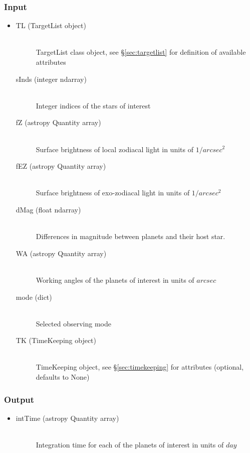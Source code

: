 \documentclass[cleanfoot]{asme2ej}
\begin{document}
\subsubsection*{Input}
\begin{itemize}
\item 
\begin{description}
    \item[TL (TargetList object)] \hfill \\ TargetList class object, see \S\ref{sec:targetlist} for definition of available attributes
    \item[sInds (integer ndarray)] \hfill \\ Integer indices of the stars of interest
    \item[fZ (astropy Quantity array)] \hfill \\ Surface brightness of local zodiacal light in units of $ 1/arcsec^2 $
    \item[fEZ (astropy Quantity array)] \hfill \\ Surface brightness of exo-zodiacal light in units of $ 1/arcsec^2 $
    \item[dMag (float ndarray)] \hfill \\ Differences in magnitude between planets and their host star.
    \item[WA (astropy Quantity array)] \hfill \\ Working angles of the planets of interest in units of $ arcsec $
    \item[mode (dict)] \hfill \\ Selected observing mode
    \item[TK (TimeKeeping object)] \hfill  \\ TimeKeeping object, see \S\ref{sec:timekeeping} for attributes (optional, defaults to None)
\end{description}
\end{itemize}
\subsubsection*{Output}
\begin{itemize}
\item 
\begin{description}
    \item[intTime (astropy Quantity array)] \hfill \\ Integration time for each of the planets of interest in units of $ day $
\end{description}
\end{itemize}
\end{document}

